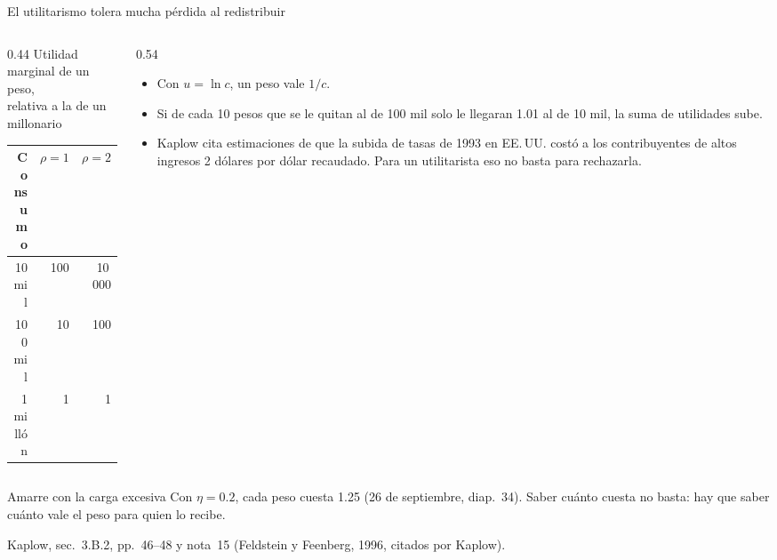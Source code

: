 \documentclass[aspectratio=169,11pt]{beamer}
\newcommand{\fuente}[1]{\par\vfill{\small\color{cGris}#1\par}}
\begin{document}
\begin{frame}{El utilitarismo tolera mucha pérdida al redistribuir}
  \begin{columns}[T]
    \begin{column}{0.44\textwidth}
      \centering
      Utilidad marginal de un peso,\\relativa a la de un millonario
      \par\medskip
      \begin{tabular}{@{}rrr@{}}
        \toprule
        Consumo & $\rho=1$ & $\rho=2$ \\
        \midrule
        10 mil & 100 & 10\,000 \\
        100 mil & 10 & 100 \\
        1 millón & 1 & 1 \\
        \bottomrule
      \end{tabular}
    \end{column}
    \begin{column}{0.54\textwidth}
      \begin{itemize}
        \item Con $u=\ln c$, un peso vale $1/c$.
        \item Si de cada 10 pesos que se le quitan al de 100 mil solo le llegaran 1.01 al de 10 mil, la suma de utilidades sube.
        \pause
        \item Kaplow cita estimaciones de que la subida de tasas de 1993 en EE.\,UU. costó a los contribuyentes de altos ingresos 2 dólares por dólar recaudado. Para un utilitarista eso no basta para rechazarla.
      \end{itemize}
    \end{column}
  \end{columns}
  \pause
  \begin{block}{Amarre con la carga excesiva}
    Con $\eta=0.2$, cada peso cuesta 1.25 (26 de septiembre, diap.~34). Saber cuánto cuesta no basta: hay que saber cuánto vale el peso para quien lo recibe.
  \end{block}
  \fuente{Kaplow, sec.~3.B.2, pp.~46--48 y nota~15 (Feldstein y Feenberg, 1996, citados por Kaplow).}
\end{frame}
\end{document}
